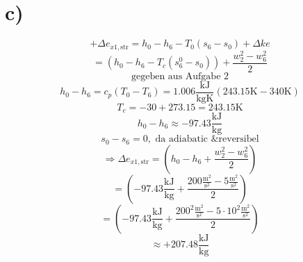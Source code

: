 

\section*{c)}

\[
+\Delta e_{x1, \text{str}} = h_0 - h_6 - T_0 (s_6 - s_0) + \Delta ke
\]
\[
= (h_0 - h_6 - T_c (s_6^0 - s_0)) + \frac{w_2^2 - w_6^2}{2}
\]
\[
\text{gegeben aus Aufgabe 2}
\]
\[
h_0 - h_6 = c_p (T_0 - T_6) = 1.006 \frac{\text{kJ}}{\text{kgK}} (243.15 \text{K} - 340 \text{K})
\]
\[
T_c = -30 + 273.15 = 243.15 \text{K}
\]
\[
h_0 - h_6 \approx -97.43 \frac{\text{kJ}}{\text{kg}}
\]
\[
s_0 - s_6 = 0, \text{ da adiabatic \& reversibel}
\]
\[
\Rightarrow \Delta e_{x1, \text{str}} = (h_0 - h_6 + \frac{w_2^2 - w_6^2}{2})
\]
\[
= (-97.43 \frac{\text{kJ}}{\text{kg}} + \frac{200 \frac{\text{m}^2}{\text{s}^2} - 5 \frac{\text{m}^2}{\text{s}^2}}{2})
\]
\[
= (-97.43 \frac{\text{kJ}}{\text{kg}} + \frac{200^2 \frac{\text{m}^2}{\text{s}^2} - 5 \cdot 10^2 \frac{\text{m}^2}{\text{s}^2}}{2})
\]
\[
\approx +207.48 \frac{\text{kJ}}{\text{kg}}
\]